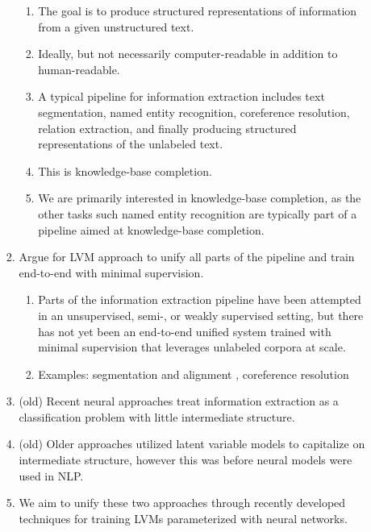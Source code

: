 \documentclass[11pt]{article}
\begin{document}
\begin{enumerate}
\begin{enumerate}
\begin{enumerate}
\begin{enumerate}
            \item The goal is to produce structured representations of information from
                a given unstructured text.
            \item Ideally, but not necessarily computer-readable in addition to human-readable.
            \item A typical pipeline for information extraction includes
                text segmentation, named entity recognition, coreference resolution,
                relation extraction, and finally producing structured representations of the unlabeled text.
            \item This is knowledge-base completion.
            \item We are primarily interested in knowledge-base completion,
                as the other tasks such named entity recognition are typically
                part of a pipeline aimed at knowledge-base completion.
            \end{enumerate}
        \item Argue for LVM approach to unify all parts of the pipeline and train
            end-to-end with minimal supervision.
            \begin{enumerate}
            \item Parts of the information extraction pipeline have been attempted in an
                unsupervised, semi-, or weakly supervised setting, but there has not yet
                been an end-to-end unified system trained with minimal supervision
                that leverages unlabeled corpora at scale.
            \item Examples: segmentation and alignment \citet{liang2009semalign}, 
                coreference resolution \citet{haghighi2010coref}
            \end{enumerate}
        \item (old) Recent neural approaches treat information extraction as a classification problem
            with little intermediate structure.
        \item (old) Older approaches utilized latent variable models to capitalize on intermediate structure,
            however this was before neural models were used in NLP.
            \citep{surdeanu2012miml,liang2009semalign}
        \item We aim to unify these two approaches through recently developed techniques for training LVMs
            parameterized with neural networks.
        \end{enumerate}

\end{enumerate}
\end{enumerate}
\end{document}
